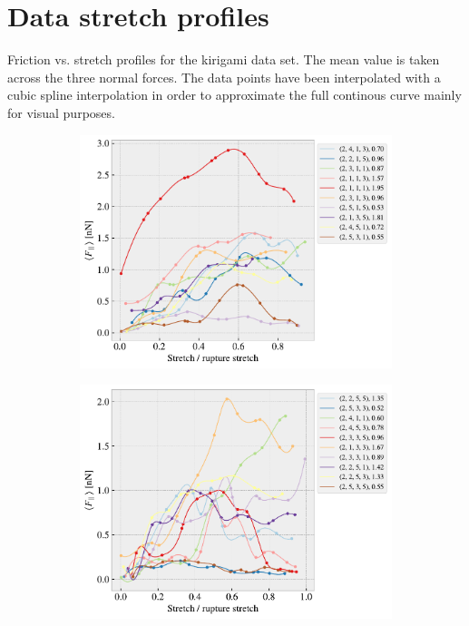 \section{Data stretch profiles}\label{sec:data_stretch_profiles}

Friction vs. stretch profiles for the kirigami data set. The mean value is taken across the three normal forces. The data points have been interpolated with a cubic spline interpolation in order to approximate the full continous curve mainly for visual purposes. 


\begin{figure}[H]
    \centering
    \begin{subfigure}[b]{0.49\textwidth}
        \centering
        \includegraphics[width=\textwidth]{figures/stretch_profiles/honeycomb/SP_0_honeycomb.pdf}
        \caption{}
        \label{fig:}
    \end{subfigure}
    \hfill
    \begin{subfigure}[b]{0.49\textwidth}
        \centering
        \includegraphics[width=\textwidth]{figures/stretch_profiles/honeycomb/SP_1_honeycomb.pdf}

\end{subfigure}
\end{figure}
